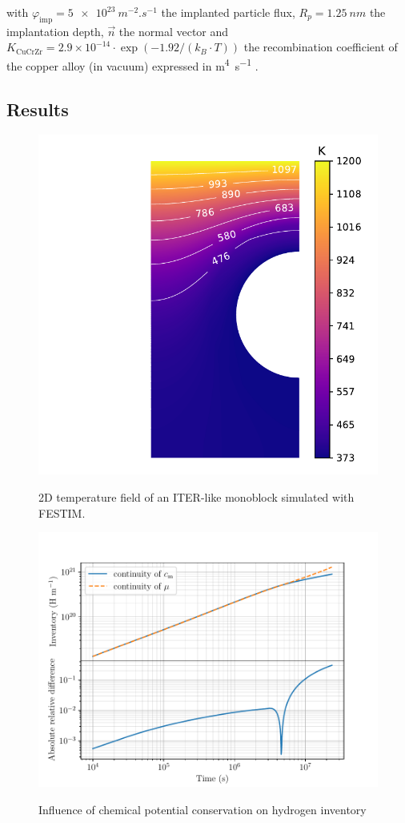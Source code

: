 with $\varphi_\mathrm{imp} = \SI{5e23}{m^{-2}.s^{-1}}$ the implanted particle flux, $R_p = \SI{1.25}{nm}$ the implantation depth, $\vec{n}$ the normal vector and $K_\mathrm{CuCrZr} = 2.9 \times 10^{-14}\cdot \exp{(-1.92/(k_B\cdot T))}$ the recombination coefficient of the copper alloy (in vacuum) expressed in \si{m^4.s^{-1}} .


\subsection{Results}

\begin{figure}
    \centering
    \includegraphics[width=0.5\linewidth]{Figures/Chapter3/monoblocks/interface_condition/iter case/temperature_field_2d.pdf}
    \label{fig: 2D temperature}
    \caption{2D temperature field of an ITER-like monoblock simulated with FESTIM.}
\end{figure}

\begin{figure}
    \centering
    \includegraphics[width=\linewidth]{Figures/Chapter3/monoblocks/interface_condition/iter case/comparison_inventory_2d.pdf}
    \label{fig: 2D inventories}
    \caption{Influence of chemical potential conservation on hydrogen inventory}
\end{figure}

